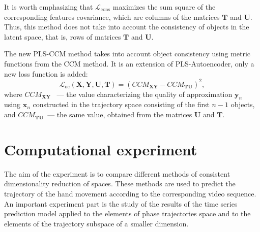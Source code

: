 \documentclass[bst/sn-mathphys]{sn-jnl}%
\newcommand{\bx}{\ensuremath{\mathbf{x}}}
\newcommand{\by}{\mathbf{y}}
\newcommand{\bT}{\mathbf{T}}
\newcommand{\bX}{\mathbf{X}}
\newcommand{\bY}{\mathbf{Y}}
\newcommand{\bU}{\mathbf{U}}
\theoremstyle{thmstyleone}%
\theoremstyle{thmstyletwo}%
\theoremstyle{thmstylethree}%
\begin{document}
It is worth emphasizing that $\mathcal{L}_{\text{cons}}$ maximizes the sum square of the corresponding features covariance, which are columns of the matrices $\bT$ and $\bU$.
Thus, this method does not take into account the consistency of objects in the latent space, that is, rows of matrices $\bT$ and $\bU$.

The new PLS-CCM method takes into account object consistency using metric functions from the CCM method. It is an extension of PLS-Autoencoder, only a new loss function is added:
$$ \mathcal{L}_\text{oc}(\bX, \bY, \bU, \bT) = \left( CCM_{\mathbf{XY}} - CCM_{\mathbf{TU}} \right)^2 ,$$
where $CCM_{\mathbf{XY}}$ ~--- the value characterizing the quality of approximation $\by_n$ using $\bx_n$ constructed in the trajectory space consisting of the first $n-1$ objects, and $CCM_{\mathbf{TU}}$~--- the same value, obtained from the matrices $\bU$ and $\bT$.

\section{Computational experiment}
The aim of the experiment is to compare different methods of consistent dimensionality reduction of spaces.
These methods are used to predict the trajectory of the hand movement according to the corresponding video sequence.
An important experiment part is the study of the results of the time series prediction model applied to the elements of phase trajectories space and to the elements of the trajectory subspace of a smaller dimension.
\end{document}
